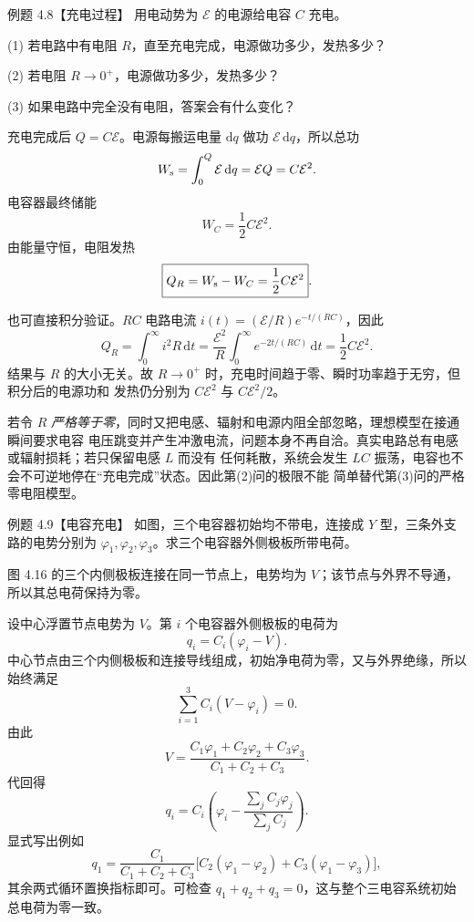 \begin{origexamplebox}{例题 4.8【充电过程】}
用电动势为 $\mathcal E$ 的电源给电容 $C$ 充电。

(1) 若电路中有电阻 $R$，直至充电完成，电源做功多少，发热多少？

(2) 若电阻 $R\to0^+$，电源做功多少，发热多少？

(3) 如果电路中完全没有电阻，答案会有什么变化？
\end{origexamplebox}

\chargingEnergyFigure
{}

\begin{xesolution}
充电完成后 $Q=C\mathcal E$。电源每搬运电量 $\mathrm dq$ 做功
$\mathcal E\,\mathrm dq$，所以总功
\[
 W_{\rm s}=\int_0^Q\mathcal E\,\mathrm dq
 =\mathcal EQ=C\mathcal E^2.
\]
电容器最终储能
\[
 W_C=\frac12C\mathcal E^2.
\]
由能量守恒，电阻发热
\[
 \boxed{Q_R=W_{\rm s}-W_C=\frac12C\mathcal E^2}.
\]

也可直接积分验证。$RC$ 电路电流
$i(t)=(\mathcal E/R)e^{-t/(RC)}$，因此
\[
 Q_R=\int_0^\infty i^2R\,\mathrm dt
 =\frac{\mathcal E^2}{R}\int_0^\infty e^{-2t/(RC)}\,\mathrm dt
 =\frac12C\mathcal E^2.
\]
结果与 $R$ 的大小无关。故 $R\to0^+$ 时，充电时间趋于零、瞬时功率趋于无穷，但积分后的电源功和
发热仍分别为 $C\mathcal E^2$ 与 $C\mathcal E^2/2$。

若令 $R$ \emph{严格等于零}，同时又把电感、辐射和电源内阻全部忽略，理想模型在接通瞬间要求电容
电压跳变并产生冲激电流，问题本身不再自洽。真实电路总有电感或辐射损耗；若只保留电感 $L$ 而没有
任何耗散，系统会发生 $LC$ 振荡，电容也不会不可逆地停在“充电完成”状态。因此第(2)问的极限不能
简单替代第(3)问的严格零电阻模型。
\end{xesolution}

\begin{origexamplebox}{例题 4.9【电容充电】}
如图，三个电容器初始均不带电，连接成 $Y$ 型，三条外支路的电势分别为
$\varphi_1,\varphi_2,\varphi_3$。求三个电容器外侧极板所带电荷。
\yCapacitorFigure
{}
\end{origexamplebox}

图 4.16 的三个内侧极板连接在同一节点上，电势均为 $V$；该节点与外界不导通，所以其总电荷保持为零。



\begin{xesolution}
设中心浮置节点电势为 $V$。第 $i$ 个电容器外侧极板的电荷为
\[
 q_i=C_i(\varphi_i-V).
\]
中心节点由三个内侧极板和连接导线组成，初始净电荷为零，又与外界绝缘，所以始终满足
\[
 \sum_{i=1}^3C_i(V-\varphi_i)=0.
\]
由此
\[
 \boxed{V=\frac{C_1\varphi_1+C_2\varphi_2+C_3\varphi_3}
 {C_1+C_2+C_3}}.
\]
代回得
\[
 \boxed{q_i=C_i\left(\varphi_i-
 \frac{\sum_jC_j\varphi_j}{\sum_jC_j}\right)}.
\]
显式写出例如
\[
 q_1=\frac{C_1}{C_1+C_2+C_3}
 \bigl[C_2(\varphi_1-\varphi_2)+C_3(\varphi_1-\varphi_3)\bigr],
\]
其余两式循环置换指标即可。可检查 $q_1+q_2+q_3=0$，这与整个三电容系统初始总电荷为零一致。
\end{xesolution}


